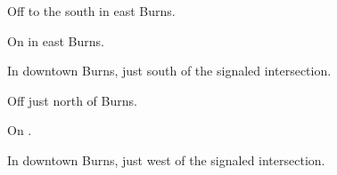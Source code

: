 

\begin{LocationList}

Off  to the south in east Burns.

On  in east Burns.

In downtown Burns, just south of the signaled intersection.

Off  just north of Burns.

\Location{\TruckStop \Gas \Rest \Service \Weigh}
On  .

In downtown Burns, just west of the signaled intersection.

\end{LocationList}
